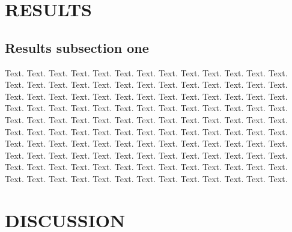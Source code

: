 \documentclass[a4,center,fleqn]{NAR}
\begin{document}
\section{RESULTS}

\subsection{Results subsection one}

Text. Text. Text. Text. Text. Text. Text. Text. Text. Text. Text.
Text. Text. Text. Text. Text. Text. Text. Text. Text. Text. Text.
Text. Text. Text. Text. Text. Text. Text. Text. Text. Text. Text.
Text. Text. Text. Text. Text. Text. Text. Text. Text. Text. Text.
Text. Text. Text. Text. Text. Text. Text. Text. Text. Text. Text.
Text. Text. Text. Text. Text. Text. Text. Text. Text. Text. Text.
Text. Text. Text. Text. Text. Text. Text. Text. Text. Text. Text.
Text. Text. Text. Text. Text. Text. Text. Text. Text. Text. Text.
Text. Text. Text. Text. Text. Text. Text. Text. Text. Text. Text.
Text. Text. Text. Text. Text. Text. Text. Text. Text. Text. Text.
Text. Text. Text. Text. Text. Text. Text. Text. Text. Text. Text.
Text. Text. Text. Text. Text. Text. Text. Text. Text.

\section{DISCUSSION}
\end{document}
